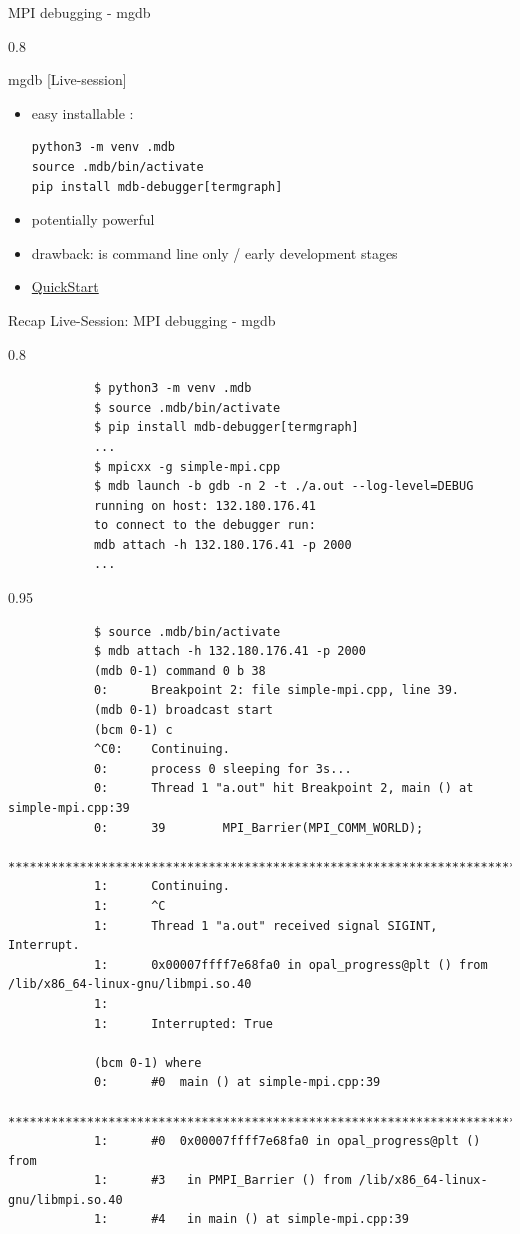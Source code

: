 \documentclass[aspectratio=1610]{beamer}
\newenvironment{centeredblock}[2][0.8\textwidth]
{ %
	\begin{center}
		\begin{varwidth}{#1} %
			\begin{block}{#2}
				\centering
			}
			{ %
			\end{block}
		\end{varwidth}
	\end{center}
}
\begin{document}
	\begin{frame}[fragile]{MPI debugging - mgdb}
		\begin{centeredblock}{mgdb [Live-session]}
			\begin{itemize}
				\item easy installable : \begin{verbatim}
python3 -m venv .mdb
source .mdb/bin/activate
pip install mdb-debugger[termgraph]
				\end{verbatim} 
				\item potentially powerful
				\item drawback: is command line only / early development stages
				\item \href{https://mdb.readthedocs.io/en/latest/quick-start.html}{QuickStart}
			\end{itemize}
		\end{centeredblock}
	\end{frame}

\begin{frame}[fragile]{Recap Live-Session: MPI debugging - mgdb}
	\begin{centeredblock}{}
		\begin{verbatim}
			$ python3 -m venv .mdb
			$ source .mdb/bin/activate
			$ pip install mdb-debugger[termgraph]
			...
			$ mpicxx -g simple-mpi.cpp 
			$ mdb launch -b gdb -n 2 -t ./a.out --log-level=DEBUG
			running on host: 132.180.176.41
			to connect to the debugger run:
			mdb attach -h 132.180.176.41 -p 2000
			...
		\end{verbatim}
	\end{centeredblock}
	\begin{centeredblock}[0.95 \textwidth]{}
		\begin{verbatim}
			$ source .mdb/bin/activate
			$ mdb attach -h 132.180.176.41 -p 2000
			(mdb 0-1) command 0 b 38
			0:      Breakpoint 2: file simple-mpi.cpp, line 39.
			(mdb 0-1) broadcast start
			(bcm 0-1) c
			^C0:    Continuing.
			0:      process 0 sleeping for 3s...
			0:      Thread 1 "a.out" hit Breakpoint 2, main () at simple-mpi.cpp:39
			0:      39        MPI_Barrier(MPI_COMM_WORLD);
			************************************************************************
			1:      Continuing.
			1:      ^C
			1:      Thread 1 "a.out" received signal SIGINT, Interrupt.
			1:      0x00007ffff7e68fa0 in opal_progress@plt () from /lib/x86_64-linux-gnu/libmpi.so.40
			1:
			1:      Interrupted: True
			
			(bcm 0-1) where
			0:      #0  main () at simple-mpi.cpp:39
			************************************************************************
			1:      #0  0x00007ffff7e68fa0 in opal_progress@plt () from 
			1:      #3   in PMPI_Barrier () from /lib/x86_64-linux-gnu/libmpi.so.40
			1:      #4   in main () at simple-mpi.cpp:39
		\end{verbatim}
	\end{centeredblock}
\end{frame}
\end{document}
